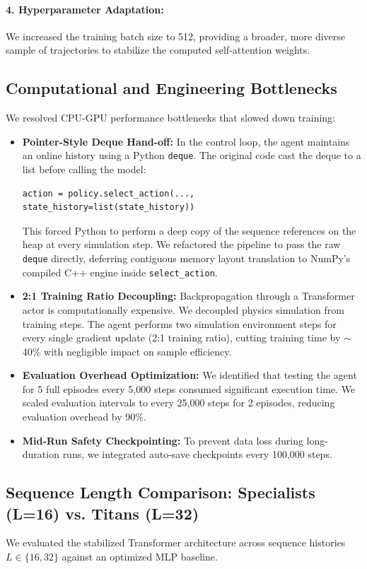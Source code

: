 \documentclass[11pt,a4paper]{article}
\begin{document}
\paragraph{4. Hyperparameter Adaptation:}
We increased the training batch size to 512, providing a broader, more diverse sample of trajectories to stabilize the computed self-attention weights.

\subsection{Computational and Engineering Bottlenecks}
We resolved CPU-GPU performance bottlenecks that slowed down training:
\begin{itemize}
    \item \textbf{Pointer-Style Deque Hand-off:} In the control loop, the agent maintains an online history using a Python \texttt{deque}. The original code cast the deque to a list before calling the model:
    \begin{lstlisting}[caption=Old Inefficient Conversion]
    action = policy.select_action(..., state_history=list(state_history))
    \end{lstlisting}
    This forced Python to perform a deep copy of the sequence references on the heap at every simulation step. We refactored the pipeline to pass the raw \texttt{deque} directly, deferring contiguous memory layout translation to NumPy's compiled C++ engine inside \texttt{select\_action}.
    \item \textbf{2:1 Training Ratio Decoupling:} Backpropagation through a Transformer actor is computationally expensive. We decoupled physics simulation from training steps. The agent performs two simulation environment steps for every single gradient update (2:1 training ratio), cutting training time by $\sim$40\% with negligible impact on sample efficiency.
    \item \textbf{Evaluation Overhead Optimization:} We identified that testing the agent for 5 full episodes every 5,000 steps consumed significant execution time. We scaled evaluation intervals to every 25,000 steps for 2 episodes, reducing evaluation overhead by 90\%.
    \item \textbf{Mid-Run Safety Checkpointing:} To prevent data loss during long-duration runs, we integrated auto-save checkpoints every 100,000 steps.
\end{itemize}

\subsection{Sequence Length Comparison: Specialists (L=16) vs. Titans (L=32)}
We evaluated the stabilized Transformer architecture across sequence histories $L \in \{16, 32\}$ against an optimized MLP baseline.
\end{document}
